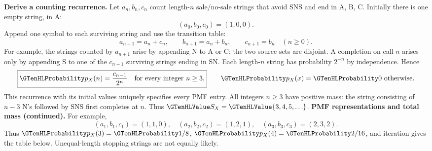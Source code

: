\textbf{Derive a counting recurrence.} Let $a_n,b_n,c_n$ count length-$n$ sale/no-sale strings that avoid SNS and end in A, B, C. Initially there is one empty string, in A:
\[
(a_0,b_0,c_0)=(1,0,0).
\]
Append one symbol to each surviving string and use the transition table:
\[
\boxed{a_{n+1}=a_n+c_n,\qquad b_{n+1}=a_n+b_n,\qquad c_{n+1}=b_n\quad(n\geq0).}
\]
For example, the strings counted by $a_{n+1}$ arise by appending N to A or C; the two source sets are disjoint. A completion on call $n$ arises only by appending S to one of the $c_{n-1}$ surviving strings ending in SN. Each length-$n$ string has probability $2^{-n}$ by independence. Hence
\[
\boxed{\cTwoMassHL{p_X(n)}=\frac{c_{n-1}}{2^n}\quad\text{for every integer }n\geq3,}
\qquad \cTwoMassHL{p_X(x)}=\cTwoMassHL{0}\text{ otherwise.}
\]
This recurrence with its initial values uniquely specifies every PMF entry. All integers $n\geq3$ have positive mass: the string consisting of $n-3$ N's followed by SNS first completes at $n$. Thus $\cTwoValue{S_X}=\cTwoValue{\{3,4,5,\ldots\}}$.
\clearpage
\textbf{PMF representations and total mass (continued).} For example,
\[
(a_1,b_1,c_1)=(1,1,0),\quad (a_2,b_2,c_2)=(1,2,1),\quad
(a_3,b_3,c_3)=(2,3,2).
\]
Thus $\cTwoMassHL{p_X(3)}=\cTwoMassHL{1/8}$, $\cTwoMassHL{p_X(4)}=\cTwoMassHL{2/16}$, and iteration gives the table below. Unequal-length stopping strings are not equally likely.
